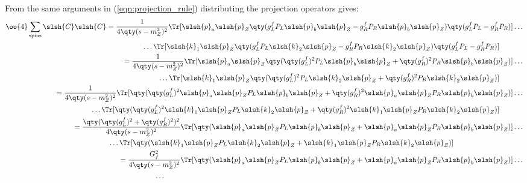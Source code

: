 	From the same arguments in (\ref{eqn:projection_rule}) distributing the projection operators gives:
	\begin{align}
		\begin{split}
			\oo{4}\sum_\text{spins}\slsh{C}\slsh{C}
			&=
			\frac{1}{4\qty(s-m_Z^2)^2}
			\Tr[
				\slsh{p}_a\slsh{p}_Z
				\qty(g_L^fP_L\slsh{p}_b\slsh{p}_Z-g_R^fP_R\slsh{p}_b\slsh{p}_Z)
				\qty(g_L^fP_L-g_R^fP_R)
				]
			\ldots\\&\qquad\qquad\quad\ldots
			\Tr[
				\slsh{k}_1\slsh{p}_Z
				\qty(g_L^fP_L\slsh{k}_2\slsh{p}_Z-g_R^fP_R\slsh{k}_2\slsh{p}_Z)
				\qty(g_L^fP_L-g_R^fP_R)
				]
		\end{split}
		\\
		\begin{split}
			&=
			\frac{1}{4\qty(s-m_Z^2)^2}
			\Tr[
				\slsh{p}_a\slsh{p}_Z
				\qty(\qty(g_L^f)^2P_L\slsh{p}_b\slsh{p}_Z+\qty(g_R^f)^2P_R\slsh{p}_b\slsh{p}_Z)
				]
			\ldots\\&\qquad\qquad\quad\ldots
			\Tr[
				\slsh{k}_1\slsh{p}_Z
				\qty(\qty(g_L^f)^2P_L\slsh{k}_2\slsh{p}_Z+\qty(g_R^f)^2P_R\slsh{k}_2\slsh{p}_Z)
				]
		\end{split}
		\\
		\begin{split}
			&=
			\frac{1}{4\qty(s-m_Z^2)^2}
			\Tr[
				\qty(\qty(g_L^f)^2\slsh{p}_a\slsh{p}_ZP_L\slsh{p}_b\slsh{p}_Z
				+\qty(g_R^f)^2\slsh{p}_a\slsh{p}_ZP_R\slsh{p}_b\slsh{p}_Z)
				]
			\ldots\\&\qquad\qquad\quad\ldots
			\Tr[
				\qty(\qty(g_L^f)^2\slsh{k}_1\slsh{p}_ZP_L\slsh{k}_2\slsh{p}_Z
				+\qty(g_R^f)^2\slsh{k}_1\slsh{p}_ZP_R\slsh{k}_2\slsh{p}_Z)
				]
		\end{split}
		\\
		\begin{split}
			&=
			\frac{\qty(\qty(g_L^f)^2+\qty(g_R^f)^2)^2}{4\qty(s-m_Z^2)^2}
			\Tr[
				\qty(\slsh{p}_a\slsh{p}_ZP_L\slsh{p}_b\slsh{p}_Z
				+\slsh{p}_a\slsh{p}_ZP_R\slsh{p}_b\slsh{p}_Z)
				]
			\ldots\\&\qquad\qquad\quad\ldots
			\Tr[
				\qty(\slsh{k}_1\slsh{p}_ZP_L\slsh{k}_2\slsh{p}_Z
				+\slsh{k}_1\slsh{p}_ZP_R\slsh{k}_2\slsh{p}_Z)
				]
		\end{split}
		\\
		\begin{split}
			&=
			\frac{G_f^2}{4\qty(s-m_Z^2)^2}
			\Tr[
				\qty(\slsh{p}_a\slsh{p}_ZP_L\slsh{p}_b\slsh{p}_Z
				+\slsh{p}_a\slsh{p}_ZP_R\slsh{p}_b\slsh{p}_Z)
				]
			\ldots\\&\qquad\qquad\quad\ldots

\end{split}
\end{align}
